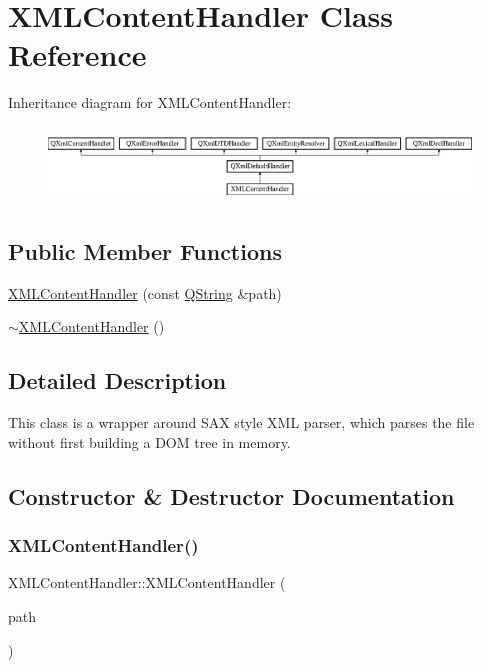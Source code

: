 \hypertarget{class_x_m_l_content_handler}{}\section{X\+M\+L\+Content\+Handler Class Reference}
\label{class_x_m_l_content_handler}
Inheritance diagram for X\+M\+L\+Content\+Handler\+:\begin{figure}[H]
\begin{center}
\leavevmode
\includegraphics[height=2.014389cm]{class_x_m_l_content_handler}
\end{center}
\end{figure}
\subsection*{Public Member Functions}
\begin{DoxyCompactItemize}
\item 
\mbox{\hyperlink{class_x_m_l_content_handler_a3770be24a256afe0e263c098baa57d9e}{X\+M\+L\+Content\+Handler}} (const \mbox{\hyperlink{class_q_string}{Q\+String}} \&path)
\item 
\mbox{\hyperlink{class_x_m_l_content_handler_aab56a9676e4ac4502553a00b750018a0}{$\sim$\+X\+M\+L\+Content\+Handler}} ()
\end{DoxyCompactItemize}


\subsection{Detailed Description}
This class is a wrapper around S\+AX style X\+ML parser, which parses the file without first building a D\+OM tree in memory. 

\subsection{Constructor \& Destructor Documentation}
\mbox{\label{class_x_m_l_content_handler_a3770be24a256afe0e263c098baa57d9e}} 
\subsubsection{\texorpdfstring{XMLContentHandler()}{XMLContentHandler()}}
{\footnotesize\ttfamily X\+M\+L\+Content\+Handler\+::\+X\+M\+L\+Content\+Handler (\begin{DoxyParamCaption}\item[{const \mbox{\hyperlink{class_q_string}{Q\+String}} \&}]{path }\end{DoxyParamCaption})\hspace{0.3cm}{\ttfamily [inline]}}

